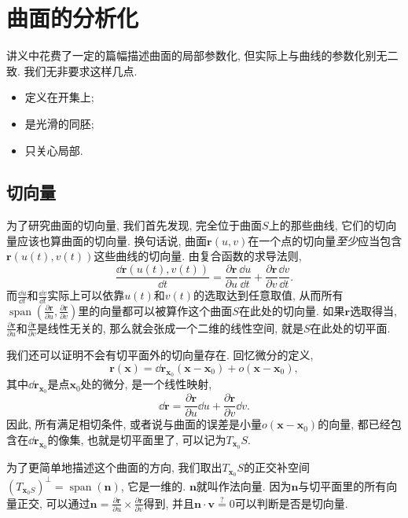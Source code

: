 \documentclass[./main.tex]{subfiles}
\begin{document}
\section{曲面的分析化}
讲义中花费了一定的篇幅描述曲面的局部参数化, 但实际上与曲线的参数化别无二致. 我们无非要求这样几点.
\begin{itemize}
    \item 定义在开集上;
    \item 是光滑的同胚;
    \item 只关心局部.
\end{itemize}
\subsection{切向量}
为了研究曲面的切向量, 我们首先发现, 完全位于曲面\(S\)上的那些曲线, 它们的切向量应该也算曲面的切向量. 换句话说, 曲面\(\mathbf{r}(u,v)\)在一个点的切向量\textit{至少}应当包含\(\mathbf{r}(u(t),v(t))\)这些曲线的切向量. 由复合函数的求导法则,
\[
    \frac{\dd\mathbf{r}(u(t),v(t))}{\dd t}=\frac{\partial\mathbf{r}}{\partial u}\frac{\dd u}{\dd t}+\frac{\partial\mathbf{r}}{\partial v}\frac{\dd v}{\dd t}.
\]
而\(\frac{\dd u}{\dd t}\)和\(\frac{\dd v}{\dd t}\)实际上可以依靠\(u(t)\)和\(v(t)\)的选取达到任意取值, 从而所有\(\operatorname{span}\left(\frac{\partial\mathbf{r}}{\partial u},\frac{\partial\mathbf{r}}{\partial v}\right)\)里的向量都可以被算作这个曲面\(S\)在此处的切向量. 如果\(\mathbf{r}\)选取得当, \(\frac{\partial\mathbf{r}}{\partial u}\)和\(\frac{\partial\mathbf{r}}{\partial v}\)是线性无关的, 那么就会张成一个二维的线性空间, 就是\(S\)在此处的切平面.

我们还可以证明不会有切平面外的切向量存在. 回忆微分的定义,
\[
    \mathbf{r}(\mathbf{x})=\dd\mathbf{r}_{\mathbf{x}_0}(\mathbf{x}-\mathbf{x}_0)+o(\mathbf{x}-\mathbf{x}_0),
\]
其中\(\dd\mathbf{r}_{\mathbf{x}_0}\)是点\(\mathbf{x}_0\)处的微分, 是一个线性映射,
\[
    \dd\mathbf{r}=\frac{\partial\mathbf{r}}{\partial u}\dd u+\frac{\partial\mathbf{r}}{\partial v}\dd v.
\]
因此, 所有满足相切条件, 或者说与曲面的误差是小量\(o(\mathbf{x}-\mathbf{x}_0)\)的向量, 都已经包含在\(\dd\mathbf{r}_{\mathbf{x}_0}\)的像集, 也就是切平面里了, 可以记为\(T_{\mathbf{x}_0}S\).

为了更简单地描述这个曲面的方向, 我们取出\(T_{\mathbf{x}_0}S\)的正交补空间\((T_{\mathbf{x}_0S})^{\perp}=\operatorname{span}(\mathbf{n})\), 它是一维的. \(\mathbf{n}\)就叫作法向量. 因为\(\mathbf{n}\)与切平面里的所有向量正交, 可以通过\(\mathbf{n}=\frac{\partial\mathbf{r}}{\partial u}\times\frac{\partial\mathbf{r}}{\partial v}\)得到, 并且\(\mathbf{n}\cdot\mathbf{v}\overset{?}{=}0\)可以判断是否是切向量.
\end{document}
